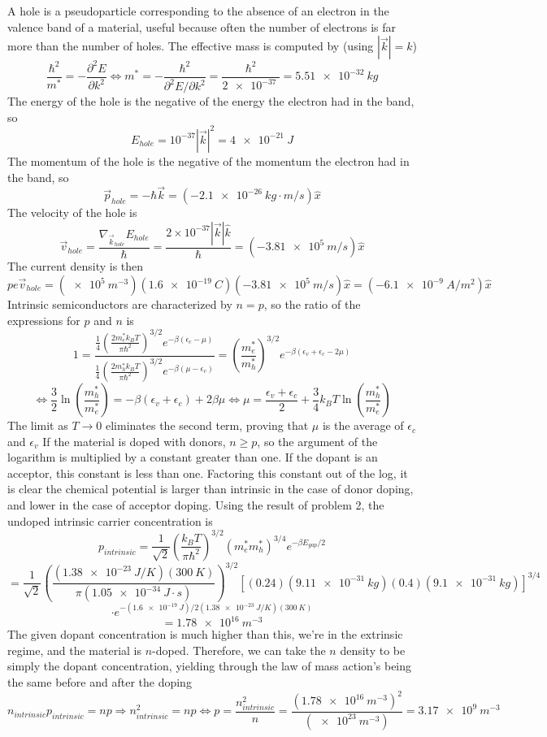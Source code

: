 \documentclass{article}
\begin{document}
\section{}
A hole is a pseudoparticle corresponding to the absence of an electron in the valence band of a material, useful because often
the number of electrons is far more than the number of holes.
The effective mass is computed by (using $|\vec{k}|=k$)
\[
  \frac{\hbar^{2}}{m^{*}}=-\frac{\partial^{2}E}{\partial k^{2}}
  \Leftrightarrow m^{*}=-\frac{\hbar^{2}}{\partial^{2}E/\partial k^{2}}
  =\frac{\hbar^{2}}{\SI{2e-37}{}}
  =\SI{5.51e-32}{kg}
\]
The energy of the hole is the negative of the energy the electron had in the band, so
\[
  E_{hole}=10^{-37}|\vec{k}|^{2}=\SI{4e-21}{J}
\]
The momentum of the hole is the negative of the momentum the electron had in the band, so
\[
  \vec{p}_{hole}=-\hbar\vec{k}=(-\SI{2.1e-26}{kg\cdot m/s})\hat{x}
\]
The velocity of the hole is
\[
  \vec{v}_{hole}=\frac{\nabla_{\vec{k}_{hole}}E_{hole}}{\hbar}=\frac{2\times 10^{-37}|\vec{k}|\hat{k}}{\hbar}
  =(-\SI{3.81e5}{m/s})\hat{x}
\]
The current density is then
\[
  pe\vec{v}_{hole}=(\SI{e5}{m^{-3}})(\SI{1.6e-19}{C})(\SI{-3.81e5}{m/s})\hat{x}
  =(-\SI{6.1e-9}{A/m^{2}})\hat{x}
\]
Intrinsic semiconductors are characterized by $n=p$, so the ratio of the expressions for $p$ and $n$ is
\[
  1=\frac{\frac{1}{4}\left( \frac{2m_{e}^{*}k_{B}T}{\pi\hbar^{2}} \right)^{3/2}e^{-\beta(\epsilon_{c}-\mu)}}
  {\frac{1}{4}\left( \frac{2m_{h}^{*}k_{B}T}{\pi\hbar^{2}} \right)^{3/2}e^{-\beta(\mu-\epsilon_{v})}}
  =\left( \frac{m_{e}^{*}}{m_{h}^{*}} \right)^{3/2}e^{-\beta(\epsilon_{v}+\epsilon_{c}-2\mu)}
\]
\[
  \Leftrightarrow \frac{3}{2}\ln\left( \frac{m_{h}^{*}}{m_{e}^{*}} \right)=-\beta(\epsilon_{v}+\epsilon_{c})+2\beta\mu
  \Leftrightarrow \mu = \frac{\epsilon_{v}+\epsilon_{c}}{2}+\frac{3}{4}k_{B}T\ln\left( \frac{m_{h}^{*}}{m_{e}^{*}} \right)
\]
The limit as $T\to 0$ eliminates the second term, proving that $\mu$ is the average of $\epsilon_{c}$ and $\epsilon_{v}$
If the material is doped with donors, $n\geq p$, so the argument of the logarithm is multiplied by a constant greater than one.
If the dopant is an acceptor, this constant is less than one.
Factoring this constant out of the log, it is clear the chemical potential is larger than intrinsic in the case of donor doping,
and lower in the case of acceptor doping.
Using the result of problem 2, the undoped intrinsic carrier concentration is
\[
  p_{intrinsic}=\frac{1}{\sqrt{2}}\left( \frac{k_{B}T}{\pi\hbar^{2}}\right)^{3/2}(m_{e}^{*}m_{h}^{*})^{3/4}e^{-\beta E_{gap}/2}
\]
\[
  =\frac{1}{\sqrt{2}}\left( \frac{(\SI{1.38e-23}{J/K})(\SI{300}{K})}{\pi(\SI{1.05e-34}{J\cdot s})} \right)^{3/2}
  [(0.24)(\SI{9.11e-31}{kg})(0.4)(\SI{9.1e-31}{kg})]^{3/4}
\]
\[
  \cdot e^{-(\SI{1.6e-19}{J})/2(\SI{1.38e-23}{J/K})(\SI{300}{K})}
\]
\[
  =\SI{1.78e16}{m^{-3}}
\]
The given dopant concentration is much higher than this, we're in the extrinsic regime, and the material is $n$-doped.
Therefore, we can take the $n$ density to be simply the dopant concentration, yielding through the law of mass action's being the same
before and after the doping
\[
  n_{intrinsic}p_{intrinsic}=np\Rightarrow n_{intrinsic}^{2}=np\Leftrightarrow p=\frac{n_{intrinsic}^{2}}{n}=\frac{(\SI{1.78e16}{m^{-3}})^{2}}
  {(\SI{e23}{m^{-3}})}=\SI{3.17e9}{m^{-3}}
\]
\end{document}
